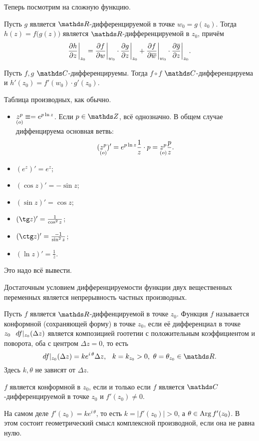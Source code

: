 Теперь посмотрим на сложную функцию.
\begin{Pre}
	Пусть $g$ является $\R$-дифференцируемой в точке $w_0 = g(z_0)$. Тогда $h(z) = f\big(g(z)\big)$ является $\R$-дифференцируемой в $z_0$, причём
	\[
		\frac{\partial h}{\partial z}\bigg|_{z_0} = \frac{\partial f}{\partial w}\bigg|_{w_0}\cdot \frac{\partial g}{\partial z}\bigg|_{z_0} + \frac{\partial f}{\partial \overline{w}}\bigg|_{w_0}\cdot \frac{\partial \overline{g}}{\partial z}\bigg|_{z_0}.
	\]
\end{Pre}
\begin{Sl}
	Пусть $f,g$ $\C$-дифференцируемы. Тогда $f\circ f$ $\C$-дифференцируема и $h'(z_0) = f'(w_0)\cdot g'(z_0)$.
\end{Sl}
\begin{Zam}
	Таблица производных, как обычно.
	\begin{itemize}
		\item $\underset{(o)}{z^p}\equiv = e^{p\ln z}$. Если $p\in\Z$, всё однозначно. В общем случае диффенцируема основная ветвь:
			\[
				(\underset{(o)}{z^p})' = e^{p\ln z}\frac1z\cdot p = \underset{(o)}{z^p}\frac pz.
			\]
		\item $(e^z)'=e^z$;
		\item $(\cos z)' = -\sin z$;
		\item $(\sin z)' = \cos z$;
		\item $(\tg z)' = \frac1{\cos^2 z}$;
		\item $(\ctg z)' = \frac{-1}{\sin^2 z}$;
		\item $(\ln z)' = \frac1z$.
	\end{itemize}
\end{Zam}
Это надо всё вывести.
\begin{Zam}
	Достаточным условием дифференцируемости функции двух вещественных переменных является непрерывность частных производных.
\end{Zam}
\begin{Def}
	Пусть $f$ является $\R$-диффенцируемой в точке $z_0$. Функция $f$ называется конформной (сохраняющей форму) в точке $z_0$, если её дифференциал в точке $z_0\pau df|_{z_0}(\Delta z)$ является композицией гоотетии с положительным коэффициентом и поворота, оба с центром $\Delta z = 0$, то есть
	\[
		df|_{z_0}(\Delta z) = k e^{i\,\theta}\Delta z,\pau k = k_{z_0}>0,\ \theta = \theta_{z_0}\in\R.
	\]
	Здесь $k,\theta$ не зависят от $\Delta z$.
\end{Def}
\begin{Ut}
	$f$ является конформной в $z_0$, если и только если $f$ является $\C$-дифференцируемой в точке $z_0$ и $f'(z_0)\ne0$.
\end{Ut}
На самом деле $f'(z_0) = k e^{i\,\theta}$, то есть $k = \big|f'(z_0)\big|>0$, а $\theta \in\operatorname{Arg} f'(z_0)$. В этом состоит геометрический смысл комплексной производной, если она не равна нулю.

